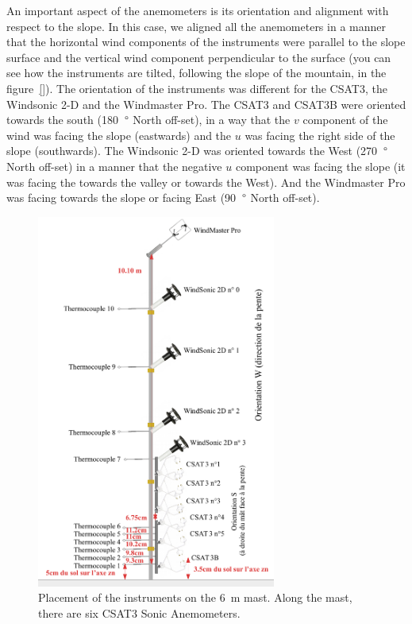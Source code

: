 An important aspect of the anemometers is its orientation and alignment with respect to the slope. In this case, we aligned all the anemometers in a manner that the horizontal wind components of the instruments were parallel to the slope surface and the vertical wind component perpendicular to the surface (you can see how the instruments are tilted, following the slope of the mountain, in the figure~\ref{}). The orientation of the instruments was different for the CSAT3, the Windsonic 2-D and the Windmaster Pro. The CSAT3 and CSAT3B were oriented towards the south (180~$\degree$ North off-set), in a way that the $v$ component of the wind was facing the slope (eastwards) and the $u$ was facing the right side of the slope (southwards). The Windsonic 2-D was oriented towards the West (270~$\degree$ North off-set) in a manner that the negative $u$ component was facing the slope (it was facing the towards the valley or towards the West). And the Windmaster Pro was facing towards the slope or facing East (90~$\degree$ North off-set).

\begin{figure}[!ht]
  \begin{center}
  \includegraphics[width=0.7\textwidth]{fig/chapter_1/Montage_J1.png}
  \caption{Placement of the instruments on the 6~m mast. Along the mast, there are six CSAT3 Sonic Anemometers.}
  \label{fig:mast}
  \end{center}
\end{figure}


